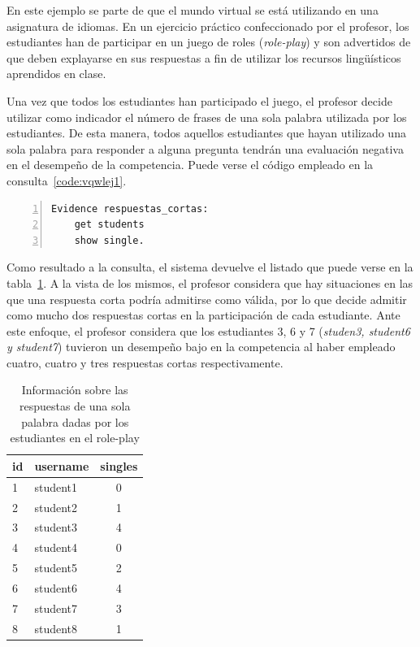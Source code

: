 			En este ejemplo se parte de que el mundo virtual se está utilizando en una asignatura de idiomas. En un ejercicio práctico confeccionado por el profesor, los estudiantes han de participar en un juego de roles (\emph{role-play}) y son advertidos de que deben explayarse en sus respuestas a fin de utilizar los recursos lingüísticos aprendidos en clase.

			Una vez que todos los estudiantes han participado el juego, el profesor decide utilizar como indicador el número de frases de una sola palabra utilizada por los estudiantes. De esta manera, todos aquellos estudiantes que hayan utilizado una sola palabra para responder a alguna pregunta tendrán una evaluación negativa en el desempeño de la competencia. Puede verse el código empleado en la consulta~\ref{code:vqwlej1}.

\begin{lstlisting}[caption=Respuestas de una sola palabra, label=code:vqwlej1,numbers=left, captionpos=b, morekeywords={Evidence,get, students, single, show, words, sentences, turns, time, points}]
Evidence respuestas_cortas:
    get students
    show single.
\end{lstlisting}

			Como resultado a la consulta, el sistema devuelve el listado que puede verse en la tabla~\ref{tab:EvsListEj1}. A la vista de los mismos, el profesor considera que hay situaciones en las que una respuesta corta podría admitirse como válida, por lo que decide admitir como mucho dos respuestas cortas en la participación de cada estudiante. Ante este enfoque, el profesor considera que los estudiantes 3, 6 y 7 (\emph{studen3, student6 y student7}) tuvieron un desempeño bajo en la competencia al haber empleado cuatro, cuatro y tres respuestas cortas respectivamente.

\begin{table}
	\centering
	\caption{Información sobre las respuestas de una sola palabra dadas por los estudiantes en el role-play}
	\label{tab:EvsListEj1}
	\begin{tabular}{|l|l|c|}
		\hline
		id & username & singles \\
		\hline
		\hline
		1 & student1 & 0  \\
		\hline
		2 & student2 & 1  \\
		\hline
		3 & student3 & 4  \\
		\hline
		4 & student4 & 0  \\
		\hline
		5 & student5 & 2  \\
		\hline
		6 & student6 & 4  \\
		\hline
		7 & student7 & 3  \\
		\hline
		8 & student8 & 1  \\
		\hline
	\end{tabular}
\end{table}

